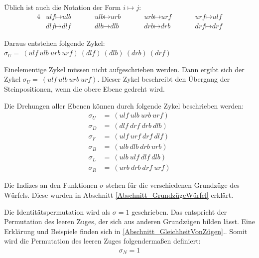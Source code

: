 \documentclass[12pt,a4paper, usenames, dvipsnames]{article}
\theoremstyle{mystyle}
\theoremstyle{definition}
\begin{document}
Üblich ist auch die Notation der Form $i \mapsto j$: 
\begin{alignat*}{4}
& \textit{ulf} \mapsto \textit{ulb} \ \ \ \ \ \ \ \ && \textit{ulb} \mapsto \textit{urb} \ \ \ \ \ \ \ \ && \textit{urb} \mapsto \textit{urf} \ \ \ \ \ \ \ \ && \textit{urf} \mapsto \textit{ulf} \\
& \textit{dlf} \mapsto \textit{dlf} \ \ \ \ \ \ \ \ && \textit{dlb} \mapsto \textit{dlb} \ \ \ \ \ \ \ \ \ && \textit{drb} \mapsto \textit{drb} \ \ \ \ \ \ \ \ && \textit{drf} \mapsto \textit{drf} 
\end{alignat*}

Daraus entstehen folgende Zykel: $\sigma_U = \ ( \textit{ulf} \ \textit{ulb} \ \textit{urb} \ \textit{urf} )\ ( \textit{dlf} )\ ( \textit{dlb} )\ ( \textit{drb} )\ ( \textit{drf} )$

Einelementige Zykel müssen nicht aufgeschrieben werden. Dann ergibt sich der Zykel $\sigma_U = \ ( \textit{ulf} \ \textit{ulb} \ \textit{urb} \ \textit{urf} )$. Dieser Zykel beschreibt den Übergang der Steinpositionen, wenn die obere Ebene gedreht wird. 


Die Drehungen aller Ebenen können durch folgende Zykel beschrieben werden: 
\begin{align*}
\sigma_U & =\ ( \textit{ulf} \ \textit{ulb} \ \textit{urb} \ \textit{urf} ) \\
\sigma_D & =\ ( \textit{dlf} \ \textit{drf} \ \textit{drb} \ \textit{dlb} ) \\
\sigma_F & =\ ( \textit{ulf} \ \textit{urf} \ \textit{drf} \ \textit{dlf} ) \\
\sigma_B & =\ ( \textit{ulb} \ \textit{dlb} \ \textit{drb} \ \textit{urb} ) \\
\sigma_L & =\ ( \textit{ulb} \ \textit{ulf} \ \textit{dlf} \ \textit{dlb} ) \\
\sigma_R & =\ ( \textit{urb} \ \textit{drb} \ \textit{drf} \ \textit{urf} ) 
\end{align*}

Die Indizes an den Funktionen $\sigma$ stehen für die verschiedenen Grundzüge des Würfels. Diese wurden in Abschnitt \ref{Abschnitt_GrundzügeWürfel} erklärt.

Die Identitätspermutation wird als $\sigma=1$ geschrieben. Das entspricht der Permutation des leeren Zuges, der sich aus anderen Grundzügen bilden lässt. Eine Erklärung und Beispiele finden sich in \ref{Abschnitt_GleichheitVonZügen}..
Somit wird die Permutation des leeren Zuges folgendermaßen definiert:
\begin{align*}
\sigma_N = 1
\end{align*}
\end{document}
